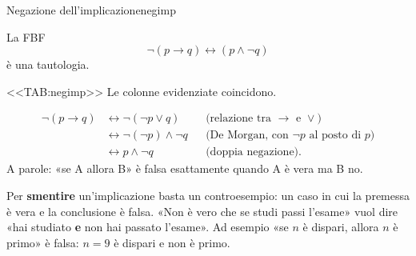 \begin{concetto}
\begin{Proposizione}{Negazione dell'implicazione}{negimp}
    \begin{prerequisiti}
    \end{prerequisiti}
    La FBF
    \[ \neg(p \rightarrow q) \leftrightarrow (p \wedge \neg q) \]
    è una tautologia.
\end{Proposizione}

\begin{dimostrazione}
    <<TAB:negimp>>
    Le colonne evidenziate coincidono.
\end{dimostrazione}

\begin{dimostrazione}
    \[
    \begin{aligned}
        \neg(p \rightarrow q) &\leftrightarrow \neg(\neg p \vee q) && \text{(relazione tra $\rightarrow$ e $\vee$)}\\
        &\leftrightarrow \neg(\neg p) \wedge \neg q && \text{(De Morgan, con $\neg p$ al posto di $p$)}\\
        &\leftrightarrow p \wedge \neg q && \text{(doppia negazione)}.
    \end{aligned}
    \]
    A parole: «se A allora B» è falsa esattamente quando A è vera ma B no.
\end{dimostrazione}
\end{concetto}

\begin{spiegazione}
    Per \textbf{smentire} un'implicazione basta un controesempio: un caso in cui la premessa è vera e la conclusione è falsa. «Non è vero che se studi
    passi l'esame» vuol dire «hai studiato \textbf{e} non hai passato l'esame». Ad esempio «se $n$ è dispari, allora $n$ è primo» è falsa: $n = 9$ è dispari
    e non è primo.
\end{spiegazione}


